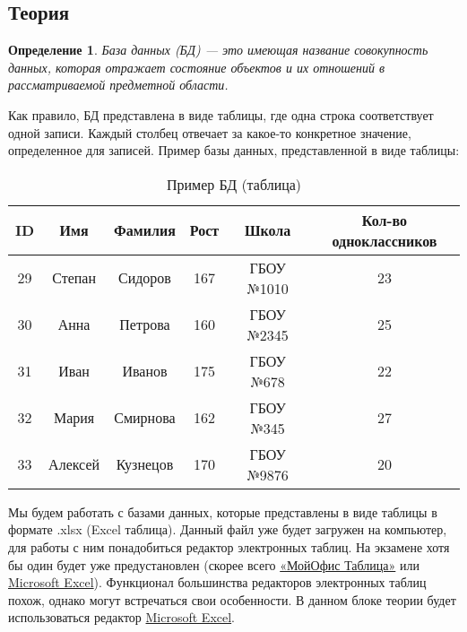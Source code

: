 \documentclass[12pt]{article}
\newtheorem{definition}{Определение}[section]
\theoremstyle{problem_style}
\begin{document}
\subsection{Теория}
\begin{definition}
База данных (БД) — это имеющая название совокупность данных, которая отражает состояние объектов и их отношений в рассматриваемой предметной области. 
\end{definition}
Как правило, БД представлена в виде таблицы, где одна строка соответствует одной записи. Каждый столбец отвечает за какое-то конкретное значение, определенное для записей. Пример базы данных, представленной в виде таблицы:
\begin{table}[!h]
    \centering
    \begin{tabular}{|c|c|c|c|c|c|} \hline
        ID & Имя & Фамилия & Рост & Школа & Кол-во одноклассников \\ \hline
        29 & Степан & Сидоров & 167 & ГБОУ №1010 & 23 \\ \hline
        30 & Анна & Петрова & 160 & ГБОУ №2345 & 25 \\ \hline
        31 & Иван & Иванов & 175 & ГБОУ №678 & 22 \\ \hline
        32 & Мария & Смирнова & 162 & ГБОУ №345 & 27 \\ \hline
        33 & Алексей & Кузнецов & 170 & ГБОУ №9876 & 20 \\ \hline
    \end{tabular}
    \caption{Пример БД (таблица)}
    \label{tab:db_examp_as_table}
\end{table}

Мы будем работать с базами данных, которые представлены в виде таблицы в формате .xlsx (Excel таблица). Данный файл уже будет загружен на компьютер, для работы с ним понадобиться редактор электронных таблиц. На экзамене хотя бы один будет уже предустановлен (скорее всего \href{https://myoffice.ru/apps/table/}{«МойОфис Таблица»} или \href{https://www.microsoft.com/ru-ru/microsoft-365/excel?market=ru}{Microsoft Excel}). Функционал большинства редакторов электронных таблиц похож, однако могут встречаться свои особенности. В данном блоке теории будет использоваться редактор \href{https://www.microsoft.com/ru-ru/microsoft-365/excel?market=ru}{Microsoft Excel}.\\
\end{document}

